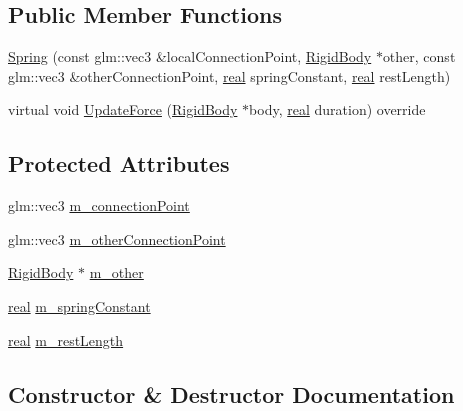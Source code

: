 \subsection*{Public Member Functions}
\begin{DoxyCompactItemize}
\item 
\hyperlink{classrum_1_1_spring_a2277a63f256766c6f92a6a7e1d505273}{Spring} (const glm\+::vec3 \&local\+Connection\+Point, \hyperlink{classrum_1_1_rigid_body}{Rigid\+Body} $\ast$other, const glm\+::vec3 \&other\+Connection\+Point, \hyperlink{namespacerum_a7e8cca23573d5eaead0f138cbaa4862c}{real} spring\+Constant, \hyperlink{namespacerum_a7e8cca23573d5eaead0f138cbaa4862c}{real} rest\+Length)
\item 
virtual void \hyperlink{classrum_1_1_spring_ac9c58b1740f347199669132722b998af}{Update\+Force} (\hyperlink{classrum_1_1_rigid_body}{Rigid\+Body} $\ast$body, \hyperlink{namespacerum_a7e8cca23573d5eaead0f138cbaa4862c}{real} duration) override
\end{DoxyCompactItemize}
\subsection*{Protected Attributes}
\begin{DoxyCompactItemize}
\item 
glm\+::vec3 \hyperlink{classrum_1_1_spring_a182a3c508405acaa78d0d69131762184}{m\+\_\+connection\+Point}
\item 
glm\+::vec3 \hyperlink{classrum_1_1_spring_a79133430ee2006e38131dc8d0942df4b}{m\+\_\+other\+Connection\+Point}
\item 
\hyperlink{classrum_1_1_rigid_body}{Rigid\+Body} $\ast$ \hyperlink{classrum_1_1_spring_ae4ab596b13dc5ea550b6025fe8eaaf43}{m\+\_\+other}
\item 
\hyperlink{namespacerum_a7e8cca23573d5eaead0f138cbaa4862c}{real} \hyperlink{classrum_1_1_spring_a820806622160bcdd02d756a1cabadc20}{m\+\_\+spring\+Constant}
\item 
\hyperlink{namespacerum_a7e8cca23573d5eaead0f138cbaa4862c}{real} \hyperlink{classrum_1_1_spring_a78a5d56210e733d7bb92e02a98ee4d49}{m\+\_\+rest\+Length}
\end{DoxyCompactItemize}


\subsection{Constructor \& Destructor Documentation}
\mbox{\label{classrum_1_1_spring_a2277a63f256766c6f92a6a7e1d505273}} 
